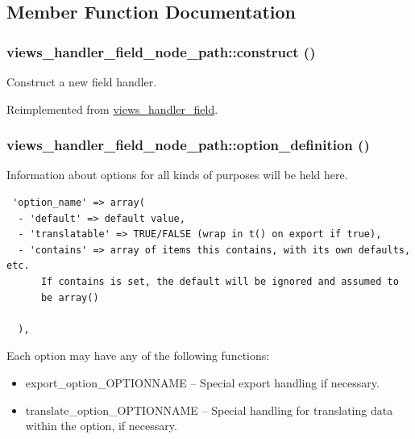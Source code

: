 \subsection{Member Function Documentation}
\hypertarget{classviews__handler__field__node__path_9f8110039f0e7f6bb87792c222c7fd06}{
\subsubsection[{construct}]{\setlength{\rightskip}{0pt plus 5cm}views\_\-handler\_\-field\_\-node\_\-path::construct ()}}
\label{classviews__handler__field__node__path_9f8110039f0e7f6bb87792c222c7fd06}


Construct a new field handler. 

Reimplemented from \hyperlink{classviews__handler__field_3d50050864c255b71c842972a45d39f6}{views\_\-handler\_\-field}.\hypertarget{classviews__handler__field__node__path_90ca65d2d782d1f58ceee0c9d53f4d23}{
\subsubsection[{option\_\-definition}]{\setlength{\rightskip}{0pt plus 5cm}views\_\-handler\_\-field\_\-node\_\-path::option\_\-definition ()}}
\label{classviews__handler__field__node__path_90ca65d2d782d1f58ceee0c9d53f4d23}


Information about options for all kinds of purposes will be held here. 

\begin{Code}\begin{verbatim} 'option_name' => array(
  - 'default' => default value,
  - 'translatable' => TRUE/FALSE (wrap in t() on export if true),
  - 'contains' => array of items this contains, with its own defaults, etc.
      If contains is set, the default will be ignored and assumed to
      be array()

  ),
\end{verbatim}
\end{Code}

 Each option may have any of the following functions:\begin{itemize}
\item export\_\-option\_\-OPTIONNAME -- Special export handling if necessary.\item translate\_\-option\_\-OPTIONNAME -- Special handling for translating data within the option, if necessary. \end{itemize}


